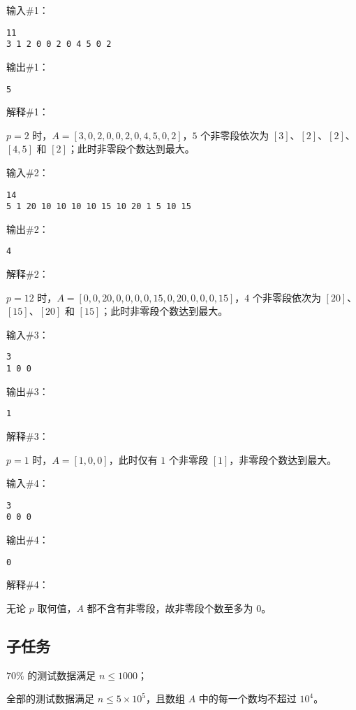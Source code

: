 输入\#1：

\begin{lstlisting}
11
3 1 2 0 0 2 0 4 5 0 2
\end{lstlisting}

输出\#1：

\begin{lstlisting}
5
\end{lstlisting}

解释\#1：

$p = 2$ 时，$A = [3, 0, 2, 0, 0, 2, 0, 4, 5, 0, 2]$，$5$ 个非零段依次为 $[3]$、$[2]$、$[2]$、$[4, 5]$ 和 $[2]$；此时非零段个数达到最大。

输入\#2：

\begin{lstlisting}
14
5 1 20 10 10 10 10 15 10 20 1 5 10 15
\end{lstlisting}

输出\#2：

\begin{lstlisting}
4
\end{lstlisting}

解释\#2：

$p = 12$ 时，$A = [0, 0, 20, 0, 0, 0, 0, 15, 0, 20, 0, 0, 0, 15]$，$4$ 个非零段依次为 $[20]$、$[15]$、$[20]$ 和 $[15]$；此时非零段个数达到最大。

输入\#3：

\begin{lstlisting}
3
1 0 0
\end{lstlisting}

输出\#3：

\begin{lstlisting}
1
\end{lstlisting}

解释\#3：

$p = 1$ 时，$A = [1, 0, 0]$，此时仅有 $1$ 个非零段 $[1]$，非零段个数达到最大。

输入\#4：

\begin{lstlisting}
3
0 0 0
\end{lstlisting}

输出\#4：

\begin{lstlisting}
0
\end{lstlisting}

解释\#4：

无论 $p$ 取何值，$A$ 都不含有非零段，故非零段个数至多为 $0$。

\subsection*{子任务}

$70\%$ 的测试数据满足 $n \le 1000$；

全部的测试数据满足 $n \le 5 \times 10^{5}$，且数组 $A$ 中的每一个数均不超过 $10^{4}$。


